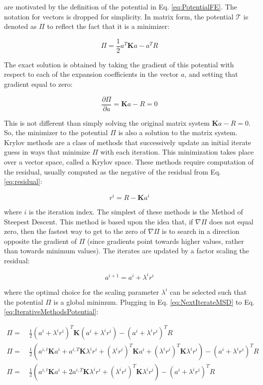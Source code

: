 \documentclass[10pt]{article}
\newcommand{\beq}{\begin{equation}}
\newcommand{\eeq}{\end{equation}}
\newcommand{\beqa}{\begin{equation}\begin{aligned}}
\newcommand{\eeqa}{\end{aligned}\end{equation}}
\begin{document}
 are motivated by the definition of the potential in Eq. \eqref{eq:PotentialFE}. The notation for vectors is dropped for simplicity. In matrix form, the potential \(\mathscr{T}\) is denoted as \(\Pi\) to reflect the fact that it is a minimizer:

\beq
\label{eq:IterativeMethodsPotential}
\Pi=\frac{1}{2}a^T\textbf{K}a-a^TR
\eeq

The exact solution is obtained by taking the gradient of this potential with respect to each of the expansion coefficients in the vector \(a\), and setting that gradient equal to zero:

\beq
\frac{\partial\Pi}{\partial a}=\textbf{K}a-R=0
\eeq

This is not different than simply solving the original matrix system \(\textbf{K}a-R=0\). So, the minimizer to the potential \(\Pi\) is also a solution to the matrix system. Krylov methods are a class of methods that successively update an initial iterate guess in ways that minimize \(\Pi\) with each iteration. This minimization takes place over a vector space, called a Krylov space. These methods require computation of the residual, usually computed as the negative of the residual from Eq. \eqref{eq:residual}:

\beq
r^i=R-\textbf{K}a^i
\eeq

where \(i\) is the iteration index. The simplest of these methods is the Method of Steepest Descent. This method is based upon the idea that, if \(\nabla\Pi\) does not equal zero, then the fastest way to get to the zero of \(\nabla\Pi\) is to search in a direction opposite the gradient of \(\Pi\) (since gradients point towards higher values, rather than towards minimum values). The iterates are updated by a factor scaling the residual:

\beq
\label{eq:NextIterateMSD}
a^{i+1}=a^i+\lambda^ir^i
\eeq

where the optimal choice for the scaling parameter \(\lambda^i\) can be selected such that the potential \(\Pi\) is a global minimum. Plugging in Eq. \eqref{eq:NextIterateMSD} to Eq. \eqref{eq:IterativeMethodsPotential}:

\beqa
\Pi=&\ \frac{1}{2}(a^i+\lambda^ir^i)^T\textbf{K}(a^i+\lambda^ir^i)-(a^i+\lambda^ir^i)^TR\\
\Pi=&\ \frac{1}{2}\left(a^{i,t}\textbf{K}a^i+a^{i,T}\textbf{K}\lambda^ir^i+(\lambda^ir^i)^T\textbf{K}a^i+(\lambda^ir^i)^T\textbf{K}\lambda^ir^i\right)-(a^i+\lambda^ir^i)^TR\\
\Pi=&\ \frac{1}{2}\left(a^{i,t}\textbf{K}a^i+2a^{i,T}\textbf{K}\lambda^ir^i+(\lambda^ir^i)^T\textbf{K}\lambda^ir^i\right)-(a^i+\lambda^ir^i)^TR\\
\eeqa
\end{document}
